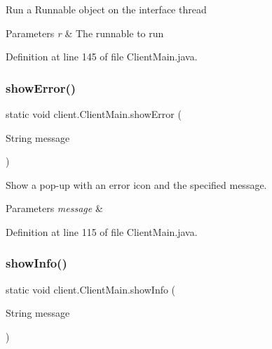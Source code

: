 Run a Runnable object on the interface thread


\begin{DoxyParams}{Parameters}
{\em r} & The runnable to run \\
\hline
\end{DoxyParams}


Definition at line 145 of file Client\+Main.\+java.

\hypertarget{classclient_1_1_client_main_ab814569831a92249ded3d7258c0ac929}{}\label{classclient_1_1_client_main_ab814569831a92249ded3d7258c0ac929} 
\subsubsection{\texorpdfstring{show\+Error()}{showError()}}
{\footnotesize\ttfamily static void client.\+Client\+Main.\+show\+Error (\begin{DoxyParamCaption}\item[{String}]{message }\end{DoxyParamCaption})\hspace{0.3cm}{\ttfamily [static]}}

Show a pop-\/up with an error icon and the specified message.


\begin{DoxyParams}{Parameters}
{\em message} & \\
\hline
\end{DoxyParams}


Definition at line 115 of file Client\+Main.\+java.

\hypertarget{classclient_1_1_client_main_af975fd50f5fb1cc3ec29b65854b2a412}{}\label{classclient_1_1_client_main_af975fd50f5fb1cc3ec29b65854b2a412} 
\subsubsection{\texorpdfstring{show\+Info()}{showInfo()}}
{\footnotesize\ttfamily static void client.\+Client\+Main.\+show\+Info (\begin{DoxyParamCaption}\item[{String}]{message }\end{DoxyParamCaption})\hspace{0.3cm}{\ttfamily [static]}}

